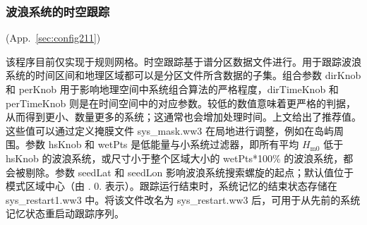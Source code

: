 \vsssub
\subsubsection{波浪系统的时空跟踪} \label{sec:ww3systrk}
\vsssub

 (App.~\ref{sec:config211})

\vspace{\baselineskip}
\noindent
该程序目前仅实现于规则网格。时空跟踪基于谱分区数据文件进行。用于跟踪波浪系统的时间区间和地理区域都可以是分区文件所含数据的子集。组合参数 {\code dirKnob} 和 {\code perKnob} 用于影响地理空间中系统组合算法的严格程度，{\code dirTimeKnob} 和 {\code perTimeKnob} 则是在时间空间中的对应参数。较低的数值意味着更严格的判据，从而得到更小、数量更多的系统；这通常也会增加处理时间。上文给出了推荐值。这些值可以通过定义掩膜文件 {\file sys\_mask.ww3} 在局地进行调整，例如在岛屿周围。参数 {\code hsKnob} 和 {\code wetPts} 是低能量与小系统过滤器，即所有平均 $H_\mathrm{m0}$ 低于 {\code hsKnob} 的波浪系统，或尺寸小于整个区域大小的 {\code wetPts}*100\% 的波浪系统，都会被剔除。参数 {\code seedLat} 和 {\code seedLon} 影响波浪系统搜索螺旋的起点；默认值位于模式区域中心（由 {. 0.} 表示）。跟踪运行结束时，系统记忆的结束状态存储在 {\file sys\_restart1.ww3} 中。将该文件改名为 {\file sys\_restart.ww3} 后，可用于从先前的系统记忆状态重启动跟踪序列。

\pb
